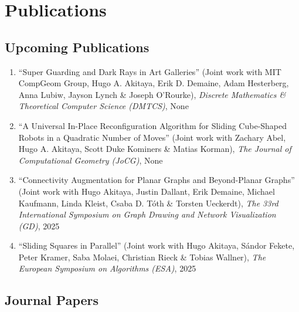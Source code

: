 \documentclass[letterpaper,11pt]{article}
\makeatletter
\newcommand{\resumeSubHeadingListStart}{\begin{itemize}[leftmargin=*]}
\newcommand{\resumeSubHeadingListEnd}{\end{itemize}}
\newcommand{\publication}[6]{
  \item ``#1'' %
   (Joint work with#2), %
     \emph{#3}, %
      #4%


}
\makeatother
\begin{document}
\section{Publications}


    \subsection*{Upcoming Publications}%
  
    \begin{enumerate}
    \setcounter{enumi}{\value{pubnum}}
      
        \publication
          {Super Guarding and Dark Rays in Art Galleries}
          {
 MIT CompGeom Group, Hugo A. Akitaya, Erik D. Demaine, Adam Hesterberg, Anna Lubiw, Jayson Lynch \& Joseph O'Rourke}
          {Discrete Mathematics \& Theoretical Computer Science (DMTCS)}
          {None}
          {%
%
%
%
          }
          {1}
 \vspace{-.5em}  
      
        \publication
          {A Universal In-Place Reconfiguration Algorithm for Sliding Cube-Shaped Robots in a Quadratic Number of Moves}
          {
 Zachary Abel, Hugo A. Akitaya, Scott Duke Kominers \& Matias Korman}
          {The Journal of Computational Geometry (JoCG)}
          {None}
          {%
%
%
%
          }
          {2}
 \vspace{-.5em}  
      
        \publication
          {Connectivity Augmentation for Planar Graphs and Beyond-Planar Graphs}
          {
 Hugo Akitaya, Justin Dallant, Erik Demaine, Michael Kaufmann, Linda Kleist, Csaba D. Tóth \& Torsten Ueckerdt}
          {The 33rd International Symposium on Graph Drawing and Network Visualization (GD)}
          {2025}
          {%
%
%
%
          }
          {3}
 \vspace{-.5em}  
      
        \publication
          {Sliding Squares in Parallel}
          {
 Hugo Akitaya, Sándor Fekete, Peter Kramer, Saba Molaei, Christian Rieck \& Tobias Wallner}
          {The European Symposium on Algorithms (ESA)}
          {2025}
          {%
%
%
%
          }
          {4}
 
    \setcounter{pubnum}{\value{enumi}}
    \end{enumerate}
    \subsection*{Journal Papers}%
  
\end{document}
